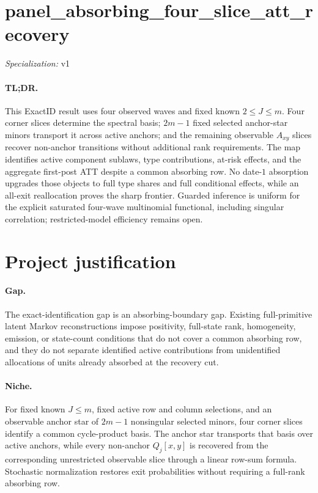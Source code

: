 \documentclass{article}
\begin{document}
\sloppy

\section*{panel\_\allowbreak{}absorbing\_\allowbreak{}four\_\allowbreak{}slice\_\allowbreak{}att\_\allowbreak{}recovery}

\noindent\textit{Specialization:} v1\par

\paragraph{TL;DR.} This ExactID result uses four observed waves and fixed known \(2\leq J\leq m\).  Four corner slices determine the spectral basis; \(2m-1\) fixed selected anchor-star minors transport it across active anchors; and the remaining observable \(A_{xy}\) slices recover non-anchor transitions without additional rank requirements.  The map identifies active component sublaws, type contributions, at-risk effects, and the aggregate first-post ATT despite a common absorbing row.  No date-\(1\) absorption upgrades those objects to full type shares and full conditional effects, while an all-exit reallocation proves the sharp frontier.  Guarded inference is uniform for the explicit saturated four-wave multinomial functional, including singular correlation; restricted-model efficiency remains open.

\section{Project justification}

\paragraph{Gap.} The exact-identification gap is an absorbing-boundary gap.  Existing full-primitive latent Markov reconstructions impose positivity, full-state rank, homogeneity, emission, or state-count conditions that do not cover a common absorbing row, and they do not separate identified active contributions from unidentified allocations of units already absorbed at the recovery cut.

\paragraph{Niche.} For fixed known \(J\leq m\), fixed active row and column selections, and an observable anchor star of \(2m-1\) nonsingular selected minors, four corner slices identify a common cycle-product basis.  The anchor star transports that basis over active anchors, while every non-anchor \(Q_j[x,y]\) is recovered from the corresponding unrestricted observable slice through a linear row-sum formula.  Stochastic normalization restores exit probabilities without requiring a full-rank absorbing row.
\end{document}
